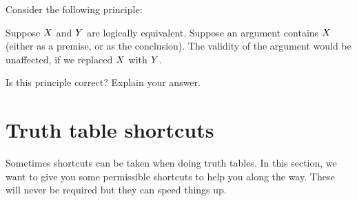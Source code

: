 \begin{practiceproblems}
	\problempart
	Consider the following principle:
	\begin{ebullet}
		\item Suppose $X$ and $Y$ are logically equivalent. Suppose an argument contains $X$ (either as a premise, or as the conclusion). The validity of the argument would be unaffected, if we replaced $X$ with $Y$.
	\end{ebullet}
	Is this principle correct? Explain your answer.
	
\end{practiceproblems}



\chapter{Truth table shortcuts}

Sometimes shortcuts can be taken when doing truth tables.
In this section, we want to give you some permissible shortcuts to help you along the way.
These will never be {required} but they can speed things up.




